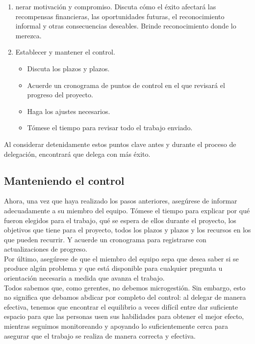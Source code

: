 \documentclass[10pt]{book}
\begin{document}
\begin{enumerate}[\bfseries 1.]
\item nerar motivación y compromiso. Discuta cómo el éxito afectará las recompensas financieras, las oportunidades futuras, el reconocimiento informal y otras consecuencias deseables. Brinde reconocimiento donde lo merezca.
\item Establecer y mantener el control.
\begin{itemize}
\item Discuta los plazos y plazos.
\item Acuerde un cronograma de puntos de control en el que revisará el progreso del proyecto.
\item Haga los ajustes necesarios.
\item Tómese el tiempo para revisar todo el trabajo enviado.
\end{itemize}
\end{enumerate}
Al considerar detenidamente estos puntos clave antes y durante el proceso de delegación, encontrará que delega con más éxito.
\subsection{Manteniendo el control}
Ahora, una vez que haya realizado los pasos anteriores, asegúrese de informar adecuadamente a su miembro del equipo. Tómese el tiempo para explicar por qué fueron elegidos para el trabajo, qué se espera de ellos durante el proyecto, los objetivos que tiene para el proyecto, todos los plazos y plazos y los recursos en los que pueden recurrir. Y acuerde un cronograma para registrarse con actualizaciones de progreso.\\
Por último, asegúrese de que el miembro del equipo sepa que desea saber si se produce algún problema y que está disponible para cualquier pregunta u orientación necesaria a medida que avanza el trabajo.\\
Todos sabemos que, como gerentes, no debemos microgestión. Sin embargo, esto no significa que debamos abdicar por completo del control: al delegar de manera efectiva, tenemos que encontrar el equilibrio a veces difícil entre dar suficiente espacio para que las personas usen sus habilidades para obtener el mejor efecto, mientras seguimos monitoreando y apoyando lo suficientemente cerca para asegurar que el trabajo se realiza de manera correcta y efectiva.
\end{document}

